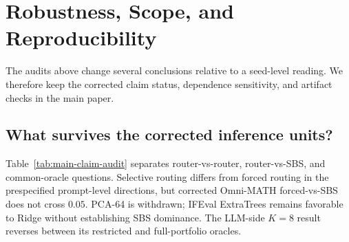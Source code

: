 \documentclass{article}
\begin{document}
\section{Robustness, Scope, and Reproducibility}
\label{sec:robustness}

The audits above change several conclusions relative to a seed-level reading. We therefore keep the corrected claim status, dependence sensitivity, and artifact checks in the main paper.

\subsection{What survives the corrected inference units?}

Table~\ref{tab:main-claim-audit} separates router-vs-router, router-vs-SBS, and common-oracle questions. Selective routing differs from forced routing in the prespecified prompt-level directions, but corrected Omni-MATH forced-vs-SBS does not cross $0.05$. PCA-64 is withdrawn; IFEval ExtraTrees remains favorable to Ridge without establishing SBS dominance. The LLM-side $K=8$ result reverses between its restricted and full-portfolio oracles.
\end{document}
